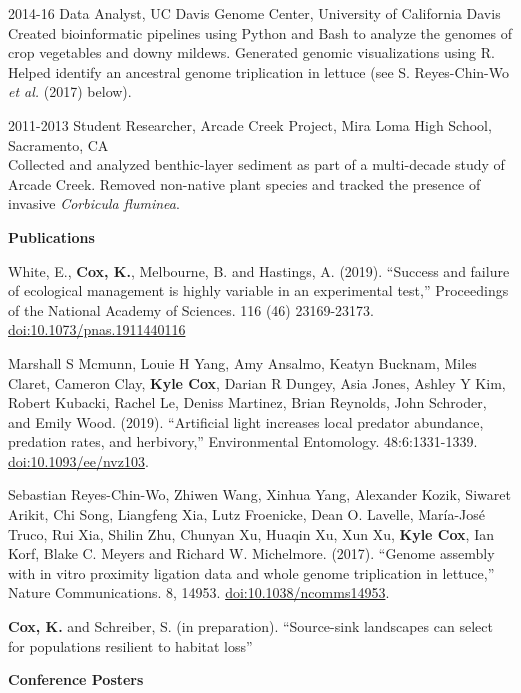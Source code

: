 \documentclass[letterpaper,12pt]{article}
\begin{document}
\begin{itemize}
\begin{deflist}
		\item [2014-16] Data Analyst, UC Davis Genome Center, University of California Davis\smallskip\\
		Created bioinformatic pipelines using Python and Bash to analyze the genomes of crop vegetables and downy mildews. Generated genomic visualizations using R. Helped identify an ancestral genome triplication in lettuce (see S. Reyes-Chin-Wo \textit{et al.} (2017) below).\smallskip
		\item [2011-2013] Student Researcher, Arcade Creek Project, Mira Loma High School, Sacramento, CA\smallskip\\
		Collected and analyzed benthic-layer sediment as part of a multi-decade study of Arcade Creek. Removed non-native plant species and tracked the presence of invasive \textit{Corbicula fluminea}.
	\end{deflist}
\end{itemize}
\vspace*{1\baselineskip}
\textbf{Publications}\medskip

\begin{hangparas}{3em}{1}
White, E., \textbf{Cox, K.}, Melbourne, B. and Hastings, A. (2019). ``Success and failure of ecological management is highly variable in an experimental test,'' Proceedings of the National Academy of Sciences. 116 (46) 23169-23173. \href{https://doi.org/10.1073/pnas.1911440116}{doi:10.1073/pnas.1911440116}

Marshall S Mcmunn, Louie H Yang, Amy Ansalmo, Keatyn Bucknam, Miles Claret, Cameron Clay, \textbf{Kyle Cox}, Darian R Dungey, Asia Jones, Ashley Y Kim, Robert Kubacki, Rachel Le, Deniss Martinez, Brian Reynolds, John Schroder, and Emily Wood. (2019). ``Artificial light increases local predator abundance, predation rates, and herbivory,'' Environmental Entomology. 48:6:1331-1339. \href{https://doi.org/10.1093/ee/nvz103}{doi:10.1093/ee/nvz103}.

Sebastian Reyes-Chin-Wo, Zhiwen Wang, Xinhua Yang, Alexander Kozik, Siwaret Arikit, Chi Song, Liangfeng Xia, Lutz Froenicke, Dean O. Lavelle, María-José Truco, Rui Xia, Shilin Zhu, Chunyan Xu, Huaqin Xu, Xun Xu, \textbf{Kyle Cox}, Ian Korf, Blake C. Meyers and Richard W. Michelmore. (2017). ``Genome assembly with in vitro proximity ligation data and whole genome triplication in lettuce,'' Nature Communications. 8, 14953. \href{https://www.nature.com/articles/ncomms14953}{doi:10.1038/ncomms14953}.

\textbf{Cox, K.} and Schreiber, S. (in preparation). ``Source-sink landscapes can select for populations resilient to habitat loss''\\
\vspace*{1\baselineskip}
\end{hangparas}
\noindent
\textbf{Conference Posters}\medskip
\end{document}
